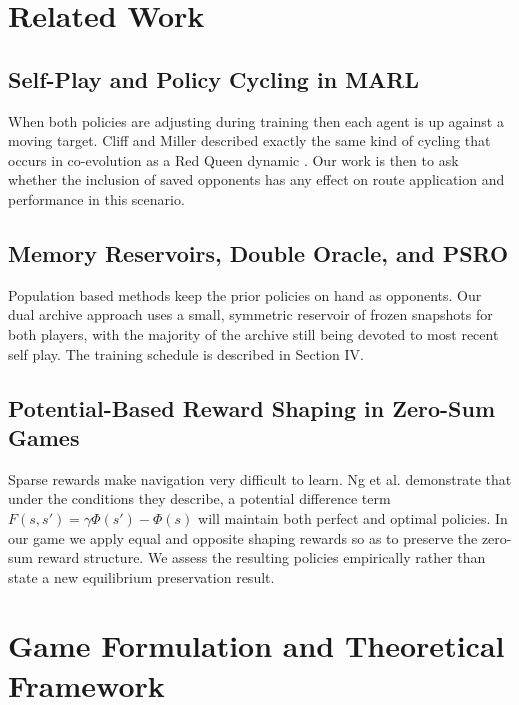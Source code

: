 \documentclass[conference]{IEEEtran}
\begin{document}
\section{Related Work}

\subsection{Self-Play and Policy Cycling in MARL}
When both policies are adjusting during training then each agent is up against a moving target. Cliff and Miller described exactly the same kind of cycling that occurs in co-evolution as a Red Queen dynamic \cite{cliff1995tracking}. Our work is then to ask whether the inclusion of saved opponents has any effect on route application and performance in this scenario.

\subsection{Memory Reservoirs, Double Oracle, and PSRO}
Population based methods keep the prior policies on hand as opponents. Our dual archive approach uses a small, symmetric reservoir of frozen snapshots for both players, with the majority of the archive still being devoted to most recent self play. The training schedule is described in Section IV.

\subsection{Potential-Based Reward Shaping in Zero-Sum Games}
Sparse rewards make navigation very difficult to learn. Ng et al. \cite{ng1999policy} demonstrate that under the conditions they describe, a potential difference term $F(s,s') = \gamma\Phi(s') - \Phi(s)$ will maintain both perfect and optimal policies. In our game we apply equal and opposite shaping rewards so as to preserve the zero-sum reward structure. We assess the resulting policies empirically rather than state a new equilibrium preservation result.

\section{Game Formulation and Theoretical Framework}
\end{document}
